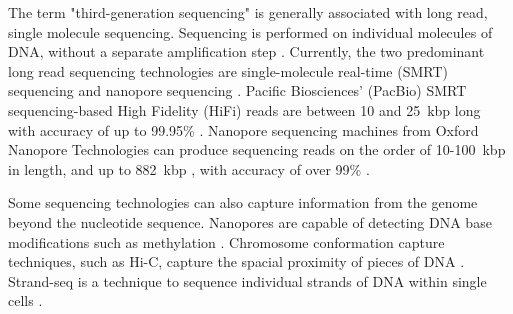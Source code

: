 \documentclass[11pt]{ucscthesis}
\begin{document}
The term "third-generation sequencing" is generally associated with long read, single molecule sequencing.
Sequencing is performed on individual molecules of DNA, without a separate amplification step \cite{sequencing_review_2016}.
Currently, the two predominant long read sequencing technologies are single-molecule real-time (SMRT) sequencing and nanopore sequencing \cite{lr_review_2023}.
Pacific Biosciences' (PacBio) SMRT sequencing-based High Fidelity (HiFi) reads are between 10 and 25~kbp long with accuracy of up to 99.95\% \cite{pacbio_2019,lr_review_2023}.
Nanopore sequencing machines from Oxford Nanopore Technologies can produce sequencing reads on the order of 10-100~kbp in length, and up to 882~kbp \cite{nanopore_ultralong_2018}, with accuracy of over 99\% \cite{nanopore-fly-accuracy_2024, damaraju_long-read_2024}.

Some sequencing technologies can also capture information from the genome beyond the nucleotide sequence.
Nanopores are capable of detecting DNA base modifications such as methylation \cite{wang_nanopore_2021}. 
Chromosome conformation capture techniques, such as Hi-C, capture the spacial proximity of pieces of DNA \cite{lieberman_hic_2009}. 
Strand-seq is a technique to sequence individual strands of DNA within single cells \cite{sanders_strandseq_2017}.



\end{document}
